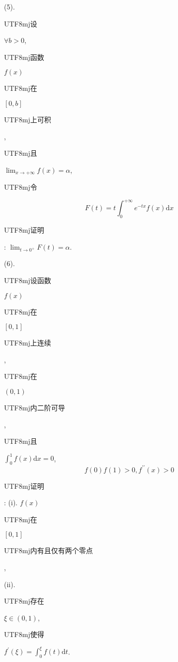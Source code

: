 \documentclass[10pt]{article}
\begin{document}
(5). \begin{CJK}{UTF8}{mj}设\end{CJK} $\forall b>0$, \begin{CJK}{UTF8}{mj}函数\end{CJK} $f(x)$ \begin{CJK}{UTF8}{mj}在\end{CJK} $[0, b]$ \begin{CJK}{UTF8}{mj}上可积\end{CJK}, \begin{CJK}{UTF8}{mj}且\end{CJK} $\lim _{x \rightarrow+\infty} f(x)=\alpha$, \begin{CJK}{UTF8}{mj}令\end{CJK}
$$
F(t)=t \int_{0}^{+\infty} e^{-t x} f(x) \mathrm{d} x
$$
\begin{CJK}{UTF8}{mj}证明\end{CJK}: $\lim _{t \rightarrow 0^{+}} F(t)=\alpha$.

(6). \begin{CJK}{UTF8}{mj}设函数\end{CJK} $f(x)$ \begin{CJK}{UTF8}{mj}在\end{CJK} $[0,1]$ \begin{CJK}{UTF8}{mj}上连续\end{CJK}, \begin{CJK}{UTF8}{mj}在\end{CJK} $(0,1)$ \begin{CJK}{UTF8}{mj}内二阶可导\end{CJK}, \begin{CJK}{UTF8}{mj}且\end{CJK} $\int_{0}^{1} f(x) \mathrm{d} x=0$,
$$
f(0) f(1)>0, f^{\prime \prime}(x)>0
$$
\begin{CJK}{UTF8}{mj}证明\end{CJK}: (i). $f(x)$ \begin{CJK}{UTF8}{mj}在\end{CJK} $[0,1]$ \begin{CJK}{UTF8}{mj}内有且仅有两个零点\end{CJK},

(ii). \begin{CJK}{UTF8}{mj}存在\end{CJK} $\xi \in(0,1)$, \begin{CJK}{UTF8}{mj}使得\end{CJK} $f^{\prime}(\xi)=\int_{0}^{\xi} f(t) \mathrm{d} t$.
\end{document}
